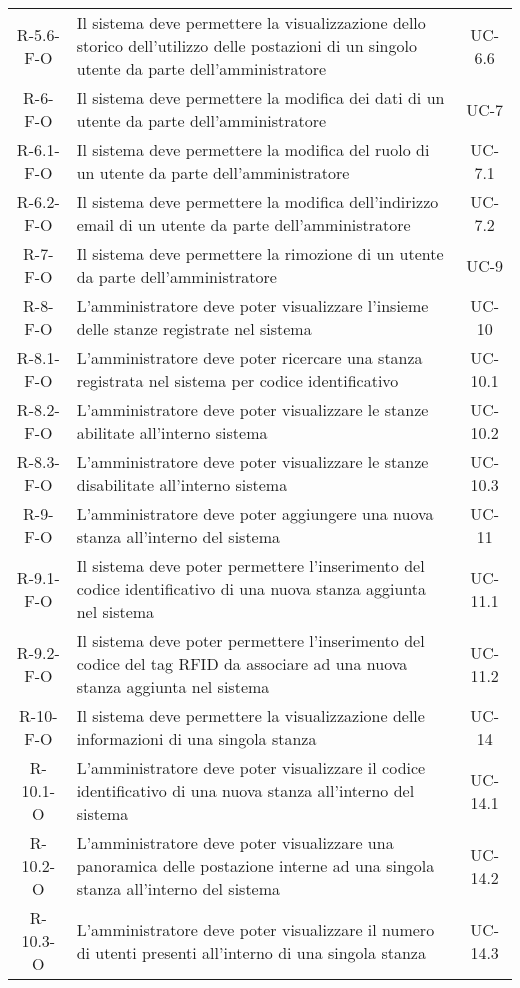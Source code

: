 \begin{longtable}{ c C{9cm} c }
    R-5.6-F-O & Il sistema deve permettere la visualizzazione dello storico dell'utilizzo delle postazioni di un singolo utente da parte dell'amministratore& UC-6.6 \\
    R-6-F-O & Il sistema deve permettere la modifica dei dati di un utente da parte dell'amministratore& UC-7 \\
    R-6.1-F-O & Il sistema deve permettere la modifica del ruolo di un utente da parte dell'amministratore& UC-7.1 \\
    R-6.2-F-O & Il sistema deve permettere la modifica dell'indirizzo email di un utente da parte dell'amministratore& UC-7.2 \\
    R-7-F-O & Il sistema deve permettere la rimozione di un utente da parte dell'amministratore& UC-9 \\
    R-8-F-O & L'amministratore deve poter visualizzare l'insieme delle stanze registrate nel sistema& UC- 10\\
    R-8.1-F-O & L'amministratore deve poter ricercare una stanza registrata nel sistema per codice identificativo& UC- 10.1\\
    R-8.2-F-O & L'amministratore deve poter visualizzare le stanze abilitate all'interno sistema& UC- 10.2\\
    R-8.3-F-O & L'amministratore deve poter visualizzare le stanze disabilitate all'interno sistema& UC- 10.3\\
    R-9-F-O &  L'amministratore deve poter aggiungere una nuova stanza all'interno del sistema& UC- 11\\
    R-9.1-F-O & Il sistema deve poter permettere l'inserimento del codice identificativo di una nuova stanza aggiunta nel sistema& UC- 11.1\\
    R-9.2-F-O & Il sistema deve poter permettere l'inserimento del codice del tag RFID da associare ad una nuova stanza aggiunta nel sistema& UC- 11.2\\
    R-10-F-O &  Il sistema deve permettere la visualizzazione delle informazioni di una singola stanza& UC- 14\\
    R-10.1-O &  L'amministratore deve poter visualizzare il codice identificativo di una nuova stanza all'interno del sistema& UC- 14.1\\
    R-10.2-O &  L'amministratore deve poter visualizzare una panoramica delle postazione interne ad una singola stanza all'interno del sistema& UC- 14.2\\
    R-10.3-O &  L'amministratore deve poter visualizzare il numero di utenti presenti all'interno di una singola stanza& UC- 14.3\\

\end{longtable}
